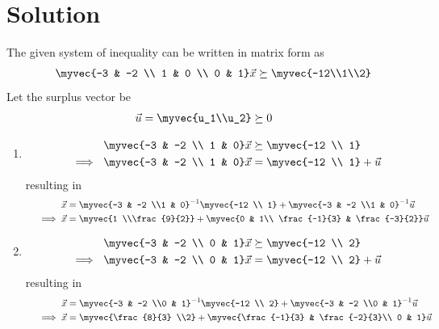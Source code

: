 \documentclass[journal,12pt,twocolumn]{IEEEtran}
\begin{document}
\section{Solution}
The given system of inequality can be written in matrix form as
\begin{align}
    \myvec{-3 & -2 \\ 1 & 0 \\ 0 & 1}\vec{x} \succeq \myvec{-12\\1\\2}
\end{align}
Let the surplus vector be
\begin{align}
    \vec{u} &= \myvec{u_1\\u_2} \succeq 0
\end{align}
\begin{enumerate}
    \item 
    \begin{align}
        \myvec{-3 & -2 \\ 1 & 0}\vec{x} &\succeq \myvec{-12 \\ 1}
        \\
        \implies  \myvec{-3 & -2 \\ 1 & 0}\vec{x} &= \myvec{-12 \\ 1} + \vec{u}
    \end{align}
    resulting in 
    \begin{align}
        \vec{x} &= \myvec{-3 & -2 \\1 & 0}^{-1}\myvec{-12 \\ 1} + \myvec{-3 & -2 \\1 & 0}^{-1}\vec{u}
        \\
        \implies \vec{x} &= \myvec{1 \\\frac{9}{2}} + \myvec{0 & 1\\ \frac{-1}{3} & \frac{-3}{2}}\vec{u}   \label{eq1}
    \end{align}
    \item 
    \begin{align}
        \myvec{-3 & -2 \\ 0 & 1}\vec{x} &\succeq \myvec{-12 \\ 2}
        \\
        \implies  \myvec{-3 & -2 \\ 0 & 1}\vec{x} &= \myvec{-12 \\ 2} + \vec{u}
    \end{align}
    resulting in 
    \begin{align}
        \vec{x} &= \myvec{-3 & -2 \\0 & 1}^{-1}\myvec{-12 \\ 2} + \myvec{-3 & -2 \\0 & 1}^{-1}\vec{u}
        \\
        \implies \vec{x} &= \myvec{\frac{8}{3} \\2} + \myvec{\frac{-1}{3} & \frac{-2}{3}\\ 0 & 1}\vec{u} \label{eq2}
    \end{align}
\end{enumerate}
\end{document}

